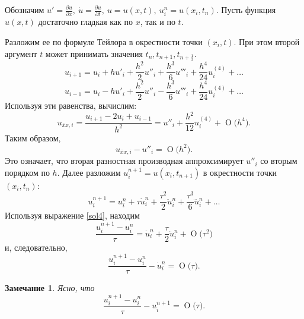 \documentclass[11pt,a4paper,twoside]{report}
\numberwithin{equation}{section}
\theoremstyle{definition}
\theoremstyle{plain}
\newtheorem*{note*}{Замечание}
\newcommand{\bigO}[1]{\ensuremath{\operatorname{O}\bigl(#1\bigr)}}
\begin{document}
%
\begin{solution}
%
    Обозначим
    $u'=\frac{\partial u}{\partial x},
    ~\dot u = \frac{\partial u}{\partial t},
    ~u = u(x,t), ~u^n_i=u(x_i, t_n).$
    Пусть функция $u(x,t)$ достаточно гладкая как по $x$, так и по $t$.

    Разложим ее по формуле Тейлора в окрестности точки $(x_i,t)$. При этом второй
    аргумент $t$ может принимать значения $t_n, t_{n+1}, t_{n+\frac12}$.
    \begin{equation}
        \label{sol1}
        u_{i+1} = u_i + hu'_i + \dfrac{h^2}{2}u''_{i} +
        \dfrac{h^3}{6} u'''_{i} + \dfrac{h^4}{24} u^{(4)}_{i} + \ldots
    \end{equation}
    \begin{equation}
        \label{sol2}
        u_{i-1} = u_i - hu'_i + \dfrac{h^2}{2}u''_{i} -
        \dfrac{h^3}{6} u'''_{i} + \dfrac{h^4}{24} u^{(4)}_{i} + \ldots
    \end{equation}
    Используя эти равенства, вычислим:
    \begin{equation}
        \label{sol3}
        u_{\overline{x}x,i} = \frac{u_{i+1}-2u_i+u_{i-1}}{h^2} =
        u''_i + \frac{h^2}{12}u^{(4)}_{i} + \bigO{h^4}.
    \end{equation}
    Таким образом,
    $$
        u_{\overline{x}x,i} - u''_i = \bigO{h^2}.
    $$
    Это означает, что вторая разностная производная аппроксимирует $u''_i$
    со вторым порядком по $h$.
    Далее разложим $u^{n+1}_i = u(x_i, t_{n+1})$ в окрестности точки $(x_i, t_n)$:
    \begin{equation}
        \label{sol4}
        u^{n+1}_i = u^n_i + \tau \dot u^n_i + \frac{\tau^2}{2} \ddot u^n_i +
        \frac{\tau^3}{6} \dddot u^n_i + \ldots
    \end{equation}
    Используя выражение \eqref{sol4}, находим
    $$
        \frac{u^{n+1}_{i}-u^n_i}{\tau} = \dot u^n_i +
        \frac{\tau}{2} \ddot u^n_i + \bigO{\tau^2}
    $$
    и, следовательно,
    \begin{equation}
        \label{sol5}
        \frac{u^{n+1}_{i}-u^n_i}{\tau} - \dot u^n_i = \bigO{\tau}.
    \end{equation}
    \begin{note*}
        Ясно, что
        \begin{equation}
            \label{sol6}
            \frac{u^{n+1}_{i}-u^n_i}{\tau} - u^{n+1}_i = \bigO{\tau}.
        \end{equation}
    \end{note*}


\end{solution}
\end{document}
